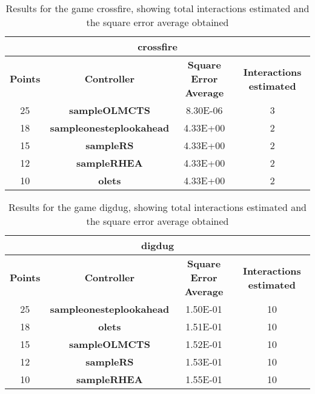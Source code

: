 \begin{table*}[!t]
\begin{center}
\begin{adjustbox}{width=1\textwidth}
\begin{tabular}{|c|c|c|c|}
\hline
\multicolumn{4}{|c|}{\textbf{crossfire}}\\
\hline
\textbf{Points} & \textbf{Controller} & \textbf{Square Error Average} & \textbf{Interactions estimated}\\
\hline
25 & \textbf{sampleOLMCTS} & 8.30E-06 & 3
 \\
\hline
18 & \textbf{sampleonesteplookahead} & 4.33E+00 & 2
 \\
\hline
15 & \textbf{sampleRS} & 4.33E+00 & 2
 \\
\hline
12 & \textbf{sampleRHEA} & 4.33E+00 & 2
 \\
\hline
10 & \textbf{olets} & 4.33E+00 & 2
 \\
\hline
\end{tabular}
\end{adjustbox}
\caption{Results for the game crossfire, showing total interactions estimated and the square error average obtained}
\label{tab:weights}
\end{center}
\end{table*}
\begin{table*}[!t]
\begin{center}
\begin{adjustbox}{width=1\textwidth}
\begin{tabular}{|c|c|c|c|}
\hline
\multicolumn{4}{|c|}{\textbf{digdug}}\\
\hline
\textbf{Points} & \textbf{Controller} & \textbf{Square Error Average} & \textbf{Interactions estimated}\\
\hline
25 & \textbf{sampleonesteplookahead} & 1.50E-01 & 10
 \\
\hline
18 & \textbf{olets} & 1.51E-01 & 10
 \\
\hline
15 & \textbf{sampleOLMCTS} & 1.52E-01 & 10
 \\
\hline
12 & \textbf{sampleRS} & 1.53E-01 & 10
 \\
\hline
10 & \textbf{sampleRHEA} & 1.55E-01 & 10
 \\
\hline
\end{tabular}
\end{adjustbox}
\caption{Results for the game digdug, showing total interactions estimated and the square error average obtained}
\label{tab:weights}
\end{center}
\end{table*}
